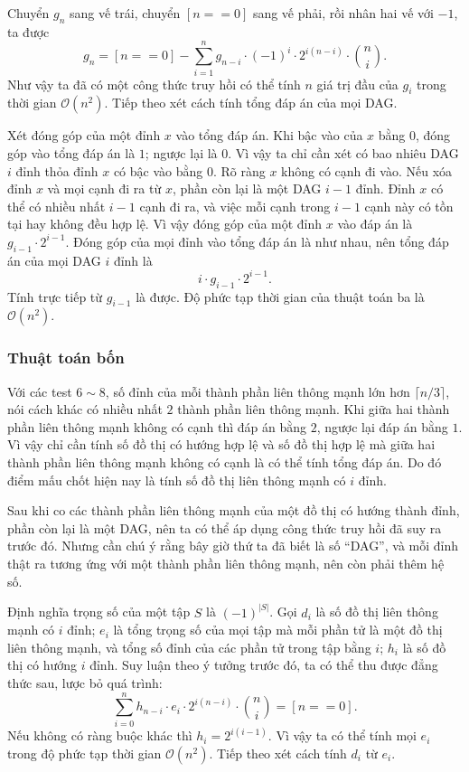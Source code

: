 \documentclass[11pt]{article}
\newcommand{\Oh}{\mathcal{O}}
\begin{document}
Chuyển \(g_n\) sang vế trái, chuyển \([n==0]\) sang vế phải, rồi nhân hai vế
với \(-1\), ta được
\[
  g_n=[n==0]-
  \sum_{i=1}^{n} g_{n-i}\cdot (-1)^i\cdot 2^{i(n-i)}\cdot \binom{n}{i}.
\]
Như vậy ta đã có một công thức truy hồi có thể tính \(n\) giá trị đầu của
\(g_i\) trong thời gian \(\Oh(n^2)\). Tiếp theo xét cách tính tổng đáp án của
mọi DAG.

Xét đóng góp của một đỉnh \(x\) vào tổng đáp án. Khi bậc vào của \(x\) bằng
\(0\), đóng góp vào tổng đáp án là \(1\); ngược lại là \(0\). Vì vậy ta chỉ
cần xét có bao nhiêu DAG \(i\) đỉnh thỏa đỉnh \(x\) có bậc vào bằng \(0\). Rõ
ràng \(x\) không có cạnh đi vào. Nếu xóa đỉnh \(x\) và mọi cạnh đi ra từ
\(x\), phần còn lại là một DAG \(i-1\) đỉnh. Đỉnh \(x\) có thể có nhiều nhất
\(i-1\) cạnh đi ra, và việc mỗi cạnh trong \(i-1\) cạnh này có tồn tại hay
không đều hợp lệ. Vì vậy đóng góp của một đỉnh \(x\) vào đáp án là
\(g_{i-1}\cdot 2^{i-1}\). Đóng góp của mọi đỉnh vào tổng đáp án là như nhau,
nên tổng đáp án của mọi DAG \(i\) đỉnh là
\[
  i\cdot g_{i-1}\cdot 2^{i-1}.
\]
Tính trực tiếp từ \(g_{i-1}\) là được. Độ phức tạp thời gian của thuật toán ba
là \(\Oh(n^2)\).

\subsubsection{Thuật toán bốn}

Với các test \(6\sim 8\), số đỉnh của mỗi thành phần liên thông mạnh lớn hơn
\(\lceil n/3\rceil\), nói cách khác có nhiều nhất \(2\) thành phần liên thông
mạnh. Khi giữa hai thành phần liên thông mạnh không có cạnh thì đáp án bằng
\(2\), ngược lại đáp án bằng \(1\). Vì vậy chỉ cần tính số đồ thị có hướng hợp
lệ và số đồ thị hợp lệ mà giữa hai thành phần liên thông mạnh không có cạnh là
có thể tính tổng đáp án. Do đó điểm mấu chốt hiện nay là tính số đồ thị liên
thông mạnh có \(i\) đỉnh.

Sau khi co các thành phần liên thông mạnh của một đồ thị có hướng thành đỉnh,
phần còn lại là một DAG, nên ta có thể áp dụng công thức truy hồi đã suy ra
trước đó. Nhưng cần chú ý rằng bây giờ thứ ta đã biết là số ``DAG'', và mỗi
đỉnh thật ra tương ứng với một thành phần liên thông mạnh, nên còn phải thêm
hệ số.

Định nghĩa trọng số của một tập \(S\) là \((-1)^{|S|}\). Gọi \(d_i\) là số đồ
thị liên thông mạnh có \(i\) đỉnh; \(e_i\) là tổng trọng số của mọi tập mà mỗi
phần tử là một đồ thị liên thông mạnh, và tổng số đỉnh của các phần tử trong
tập bằng \(i\); \(h_i\) là số đồ thị có hướng \(i\) đỉnh. Suy luận theo ý
tưởng trước đó, ta có thể thu được đẳng thức sau, lược bỏ quá trình:
\[
  \sum_{i=0}^{n}
  h_{n-i}\cdot e_i\cdot 2^{i(n-i)}\cdot \binom{n}{i}
  = [n==0].
\]
Nếu không có ràng buộc khác thì \(h_i=2^{i(i-1)}\). Vì vậy ta có thể tính mọi
\(e_i\) trong độ phức tạp thời gian \(\Oh(n^2)\). Tiếp theo xét cách tính
\(d_i\) từ \(e_i\).
\end{document}
